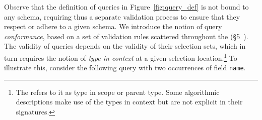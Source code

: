 Observe that the definition of queries in Figure~\ref{fig:query_def} is not bound to any schema, requiring thus a separate validation process to ensure that they respect or adhere to a given schema. We introduce the notion of query \textit{conformance}, based on a set of validation rules scattered throughout the \spec (\cf\S5~\cite{gqlspec}). The validity of queries depends on the validity of their selection sets, which in turn requires the notion of \textit{type in context} at a given selection location.\footnote{The \spec refers to it as type in scope or parent type. Some algorithmic descriptions make use of the types in context but are not explicit in their signatures.} %
To illustrate this, consider the following query with two occurrences of field \texttt{name}.

